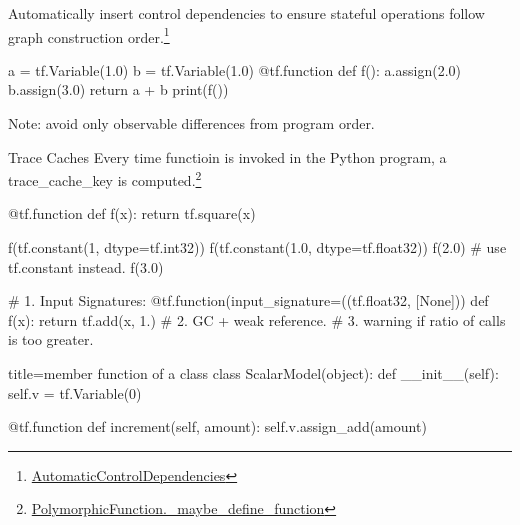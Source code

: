 \begin{frame}[fragile]
    Automatically insert control dependencies to ensure stateful operations follow graph construction order.\footnote{\href{https://github.com/tensorflow/tensorflow/blob/8c072a519e2beed483adb361a9be934a47bee366/tensorflow/python/framework/auto_control_deps.py\#L31}{AutomaticControlDependencies}}

    \begin{tcblisting}{}
        a = tf.Variable(1.0)
        b = tf.Variable(1.0)
        @tf.function
        def f():
          a.assign(2.0)
          b.assign(3.0)
          return a + b
        print(f())
    \end{tcblisting}

    Note: avoid only observable differences from program order.
\end{frame}

\begin{frame}[fragile]{Trace Caches}
    Every time functioin is invoked in the Python program, a trace\_cache\_key is computed.\footnote{\href{https://github.com/tensorflow/tensorflow/blob/8c072a519e2beed483adb361a9be934a47bee366/tensorflow/python/eager/function.py\#L884}{PolymorphicFunction.\_maybe\_define\_function}}

    \begin{tcblisting}{}
        @tf.function
        def f(x):
          return tf.square(x)

        f(tf.constant(1, dtype=tf.int32))
        f(tf.constant(1.0, dtype=tf.float32))
        f(2.0)  # use tf.constant instead.
        f(3.0)

        # 1. Input Signatures:
        @tf.function(input_signature=((tf.float32, [None]))
        def f(x):
          return tf.add(x, 1.)
        # 2. GC + weak reference.
        # 3. warning if ratio of calls is too greater.
    \end{tcblisting}
\end{frame}


\begin{frame}[fragile]
    \begin{tcblisting}{title=member function of a class}
        class ScalarModel(object):
          def __init__(self):
            self.v = tf.Variable(0)

          @tf.function
          def increment(self, amount):
            self.v.assign_add(amount)
    \end{tcblisting}
\end{frame}
